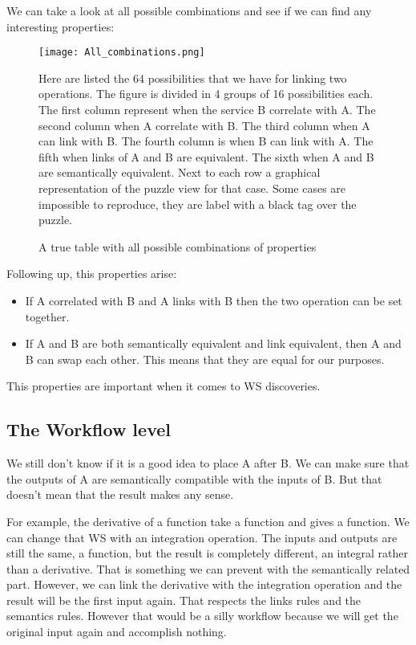 \documentclass[a4paper,10pt]{article}
\begin{document}
  We can take a look at all possible combinations and see if we can find any interesting properties:

  \begin{figure}[H]
  {\centering
  \texttt{[image: All\_combinations.png]}
  \caption{A true table with all possible combinations of properties} \label{fig:combinations}}
  \medskip
  \small
  Here are listed the 64 possibilities that we have for linking two operations. The figure is divided in 4 groups of 16 possibilities each. The first column represent when the service B correlate with A. The second column when A correlate with B. The third column when A can link with B. The fourth column is when B can link with A. The fifth when links of A and B are equivalent. The sixth when A and B are semantically equivalent. Next to each row a graphical representation of the puzzle view for that case. Some cases are impossible to reproduce, they are label with a black tag over the puzzle. 
  \end{figure}

  Following up, this properties arise:\vspace{3 mm}
  \begin{itemize}
  \item If A correlated with B and A links with B then the two operation can be set together.
  \item If A and B are both semantically equivalent and link equivalent, then A and B can swap each other. This means that they are equal for our purposes.
  \end{itemize}

  This properties are important when it comes to WS discoveries.

  \subsection{The Workflow level}

  We still don't know if it is a good idea to place A after B. We can make sure that the outputs of A are semantically compatible with the inputs of B. But that doesn't mean that the result makes any sense.\vspace{3 mm}

  For example, the derivative of a function take a function and gives a function. We can change that WS with an integration operation. The inputs and outputs are still the same, a function,  but the result is completely different, an integral rather than a derivative. That is something we can prevent with the semantically related part. However, we can link the derivative with the integration operation and the result will be the first input again. That respects the links rules and the semantics rules. However that would be a silly workflow because we will get the original input again and accomplish nothing.\vspace{3 mm}
\end{document}
